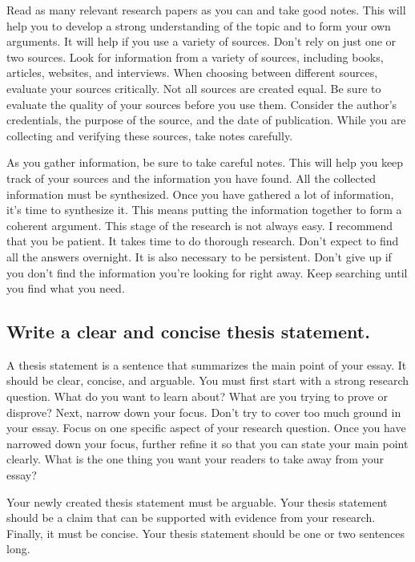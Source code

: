 \documentclass[
]{book}
\begin{document}
Read as many relevant research papers as you can and take good notes. This will help you to develop a strong understanding of the topic and to form your own arguments. It will help if you use a variety of sources. Don't rely on just one or two sources. Look for information from a variety of sources, including books, articles, websites, and interviews. When choosing between different sources, evaluate your sources critically. Not all sources are created equal. Be sure to evaluate the quality of your sources before you use them. Consider the author's credentials, the purpose of the source, and the date of publication. While you are collecting and verifying these sources, take notes carefully.

As you gather information, be sure to take careful notes. This will help you keep track of your sources and the information you have found. All the collected information must be synthesized. Once you have gathered a lot of information, it's time to synthesize it. This means putting the information together to form a coherent argument. This stage of the research is not always easy. I recommend that you be patient. It takes time to do thorough research. Don't expect to find all the answers overnight. It is also necessary to be persistent. Don't give up if you don't find the information you're looking for right away. Keep searching until you find what you need.

\hypertarget{write-a-clear-and-concise-thesis-statement.}{%
\subsection*{Write a clear and concise thesis statement.}\label{write-a-clear-and-concise-thesis-statement.}}

A thesis statement is a sentence that summarizes the main point of your essay. It should be clear, concise, and arguable. You must first start with a strong research question. What do you want to learn about? What are you trying to prove or disprove? Next, narrow down your focus. Don't try to cover too much ground in your essay. Focus on one specific aspect of your research question. Once you have narrowed down your focus, further refine it so that you can state your main point clearly. What is the one thing you want your readers to take away from your essay?

Your newly created thesis statement must be arguable. Your thesis statement should be a claim that can be supported with evidence from your research. Finally, it must be concise. Your thesis statement should be one or two sentences long.
\end{document}
